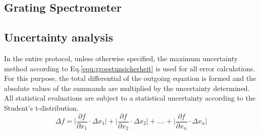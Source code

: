 \subsection{Grating Spectrometer}





\subsection{Uncertainty analysis}
\label{sec:unsichi}

In the entire protocol, unless otherwise specified, the maximum uncertainty method according to Eq.\ref{equ:groestunsicherheit} \cite{MMETH} is used for all error calculations.
For this purpose, the total differential of the outgoing equation is formed and the absolute values of the summands are multiplied by the uncertainty determined.
All statistical evaluations are subject to a statistical uncertainty according to the Student's t-distribution.
\begin{equation}
    \varDelta f = \biggl| \frac{\partial f}{\partial x_{1}} \cdot \varDelta x_{1} \biggl| + \biggl| \frac{\partial f}{\partial x_{2}} \cdot \varDelta x_{2} \biggl| + .... + \biggl| \frac{\partial f}{\partial x_{n}} \cdot \varDelta x_{n} \biggl|
    \label{equ:groestunsicherheit}
\end{equation}
\newpage